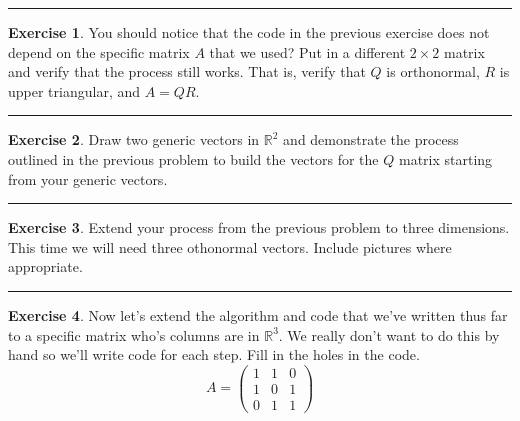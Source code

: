 \documentclass[
]{book}
\theoremstyle{definition}
\theoremstyle{definition}
\theoremstyle{definition}
\newtheorem{exercise}{Exercise}[chapter]
\theoremstyle{remark}
\begin{document}
\begin{center}\rule{0.5\linewidth}{0.5pt}\end{center}

\begin{exercise}
\protect\hypertarget{exr:unnamed-chunk-344}{}{\label{exr:unnamed-chunk-344} }You should notice that the code in the previous exercise does not depend on the specific matrix \(A\) that we used? Put in a different \(2 \times 2\) matrix and verify that the process still works. That is, verify that \(Q\) is orthonormal, \(R\) is upper triangular, and \(A = QR\).
\end{exercise}

\begin{center}\rule{0.5\linewidth}{0.5pt}\end{center}

\begin{exercise}
\protect\hypertarget{exr:unnamed-chunk-345}{}{\label{exr:unnamed-chunk-345} }Draw two generic vectors in \(\mathbb{R}^2\) and demonstrate the process outlined in the previous problem to build the vectors for the \(Q\) matrix starting from your generic vectors.
\end{exercise}

\begin{center}\rule{0.5\linewidth}{0.5pt}\end{center}

\begin{exercise}
\protect\hypertarget{exr:unnamed-chunk-346}{}{\label{exr:unnamed-chunk-346} }Extend your process from the previous problem to three dimensions. This time we will need three othonormal vectors. Include pictures where appropriate.
\end{exercise}

\begin{center}\rule{0.5\linewidth}{0.5pt}\end{center}

\begin{exercise}
\protect\hypertarget{exr:unnamed-chunk-347}{}{\label{exr:unnamed-chunk-347} }Now let's extend the algorithm and code that we've written thus far to a specific matrix who's columns are in \(\mathbb{R}^3\). We really don't want to do this by hand so we'll write code for each step. Fill in the holes in the code.
\[ A = \begin{pmatrix} 1 & 1 & 0 \\ 1 & 0 & 1 \\ 0 & 1 & 1 \end{pmatrix} \]
\end{exercise}
\end{document}
